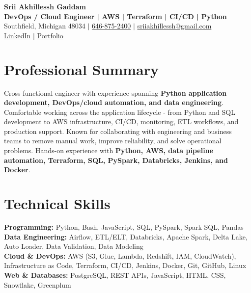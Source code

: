 \documentclass[letterpaper,10pt]{article}
\begin{document}
\fontsize{9.35pt}{10.45pt}\selectfont

\begin{center}
    {\LARGE \textbf{Srii Akhillessh Gaddam}} \\[-1pt]
    \textbf{DevOps / Cloud Engineer | AWS | Terraform | CI/CD | Python} \\[2pt]
    Southfield, Michigan 48034 $|$
    \href{tel:6468752400}{646-875-2400} $|$
    \href{mailto:sriiakhillessh@gmail.com}{sriiakhillessh@gmail.com} \\[1pt]
    \href{https://www.linkedin.com/in/srii-akhiilessh-gaddam-b48668191/}{LinkedIn} $|$
    \href{https://sriiakhillesshg.github.io/portfolio/}{Portfolio}
\end{center}
\vspace{-8pt}

\section{Professional Summary}
\small{Cross-functional engineer with experience spanning \textbf{Python application development, DevOps/cloud automation, and data engineering}. Comfortable working across the application lifecycle - from Python and SQL development to AWS infrastructure, CI/CD, monitoring, ETL workflows, and production support. Known for collaborating with engineering and business teams to remove manual work, improve reliability, and solve operational problems. Hands-on experience with \textbf{Python, AWS, data pipeline automation, Terraform, SQL, PySpark, Databricks, Jenkins, and Docker}.}

\section{Technical Skills}
\small{
\textbf{Programming:} Python, Bash, JavaScript, SQL, PySpark, Spark SQL, Pandas \\
\textbf{Data Engineering:} Airflow, ETL/ELT, Databricks, Apache Spark, Delta Lake, Auto Loader, Data Validation, Data Modeling \\
\textbf{Cloud \& DevOps:} AWS (S3, Glue, Lambda, Redshift, IAM, CloudWatch), Infrastructure as Code, Terraform, CI/CD, Jenkins, Docker, Git, GitHub, Linux \\
\textbf{Web \& Databases:} PostgreSQL, REST APIs, JavaScript, HTML, CSS, Snowflake, Greenplum
}
\end{document}
